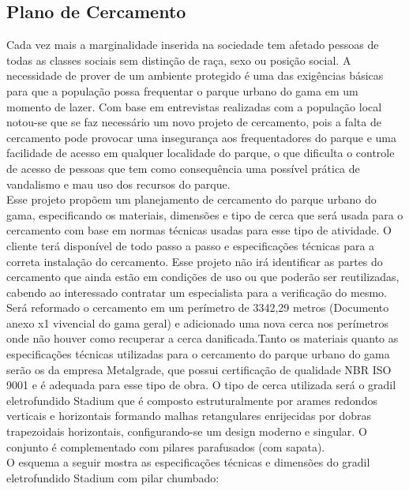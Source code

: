\subsection{Plano de Cercamento}

Cada vez mais a marginalidade inserida na sociedade tem afetado pessoas de todas as classes sociais sem distin\c{c}\~ao de ra\c{c}a, sexo ou posi\c{c}\~ao social. A necessidade de prover de um ambiente protegido \'e uma das exig\^encias b\'asicas para que a popula\c{c}\~ao possa frequentar o parque urbano do gama em um momento de lazer. Com base em entrevistas realizadas com a popula\c{c}\~ao local notou-se que se faz necess\'ario um novo projeto de cercamento, pois a falta de cercamento pode provocar uma inseguran\c{c}a aos frequentadores do parque e uma facilidade de acesso em qualquer localidade do parque, o que dificulta o controle de acesso de pessoas que tem como consequ\^encia uma poss\'ivel pr\'atica de vandalismo e mau uso dos recursos do parque. \\ Esse projeto prop\~oem um planejamento de cercamento do parque urbano do gama, especificando os materiais, dimens\~oes e tipo de cerca que ser\'a usada para o cercamento com base em normas t\'ecnicas usadas para esse tipo de atividade. O cliente ter\'a dispon\'ivel de todo passo a passo e especifica\c{c}\~oes t\'ecnicas para a correta instala\c{c}\~ao do cercamento. Esse projeto n\~ao ir\'a identificar as partes do cercamento que ainda est\~ao em condi\c{c}\~oes de uso ou que poder\~ao ser reutilizadas, cabendo ao interessado contratar um especialista para a verifica\c{c}\~ao do mesmo. \\ Ser\'a reformado o cercamento em um per\'imetro de 3342,29 metros (Documento anexo x1 vivencial do gama geral) e adicionado uma nova cerca nos per\'imetros onde n\~ao houver como recuperar a cerca danificada.Tanto os materiais quanto as especifica\c{c}\~oes t\'ecnicas utilizadas para o cercamento do parque urbano do gama ser\~ao os da empresa Metalgrade, que possui certifica\c{c}\~ao de qualidade NBR ISO 9001 e \'e adequada para esse tipo de obra.  O tipo de cerca utilizada ser\'a o gradil eletrofundido Stadium que \'e composto estruturalmente por arames redondos verticais e horizontais formando malhas retangulares enrijecidas por dobras trapezoidais horizontais, configurando-se um design moderno e singular. O conjunto \'e complementado com  pilares parafusados (com sapata). \cite{CatalogoCercamento} \\ O esquema a seguir mostra as especifica\c{c}\~oes t\'ecnicas e dimens\~oes do gradil eletrofundido Stadium com pilar chumbado:

